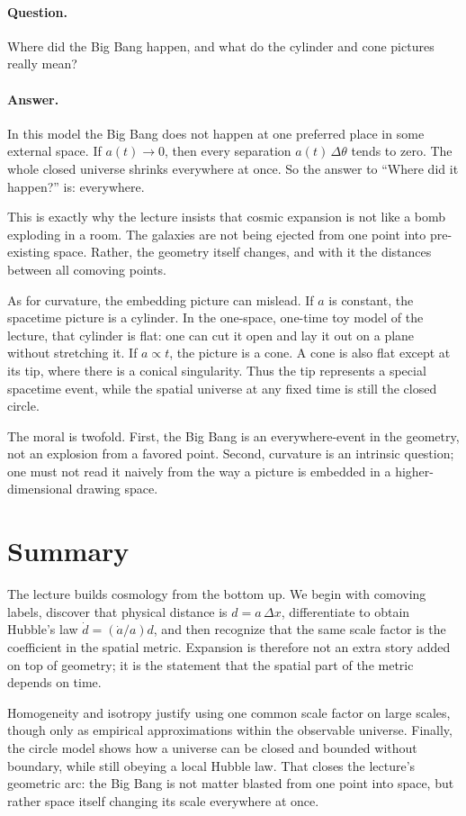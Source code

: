 \paragraph{Question.} Where did the Big Bang happen, and what do the cylinder and cone pictures really mean?

\paragraph{Answer.} In this model the Big Bang does not happen at one preferred place in some external space. If \(a(t)\to 0\), then every separation \(a(t)\,\Delta\theta\) tends to zero. The whole closed universe shrinks everywhere at once. So the answer to ``Where did it happen?'' is: everywhere.

This is exactly why the lecture insists that cosmic expansion is not like a bomb exploding in a room. The galaxies are not being ejected from one point into pre-existing space. Rather, the geometry itself changes, and with it the distances between all comoving points.

As for curvature, the embedding picture can mislead. If \(a\) is constant, the spacetime picture is a cylinder. In the one-space, one-time toy model of the lecture, that cylinder is flat: one can cut it open and lay it out on a plane without stretching it. If \(a\propto t\), the picture is a cone. A cone is also flat except at its tip, where there is a conical singularity. Thus the tip represents a special spacetime event, while the spatial universe at any fixed time is still the closed circle.

The moral is twofold. First, the Big Bang is an everywhere-event in the geometry, not an explosion from a favored point. Second, curvature is an intrinsic question; one must not read it naively from the way a picture is embedded in a higher-dimensional drawing space.

\section{Summary}

The lecture builds cosmology from the bottom up. We begin with comoving labels, discover that physical distance is \(d=a\,\Delta x\), differentiate to obtain Hubble's law \(\dot d=(\dot a/a)d\), and then recognize that the same scale factor is the coefficient in the spatial metric. Expansion is therefore not an extra story added on top of geometry; it is the statement that the spatial part of the metric depends on time.

Homogeneity and isotropy justify using one common scale factor on large scales, though only as empirical approximations within the observable universe. Finally, the circle model shows how a universe can be closed and bounded without boundary, while still obeying a local Hubble law. That closes the lecture's geometric arc: the Big Bang is not matter blasted from one point into space, but rather space itself changing its scale everywhere at once.